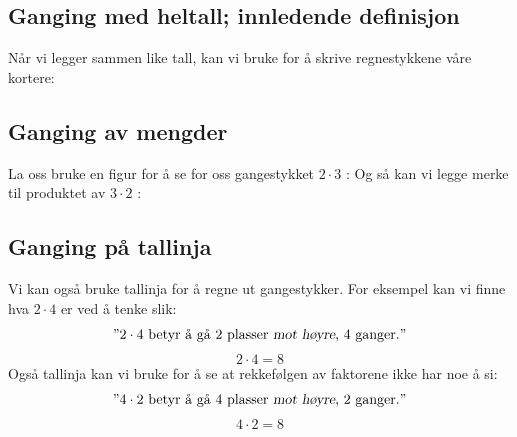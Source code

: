 \subsection*{Ganging med heltall; innledende definisjon}
Når vi legger sammen like tall, kan vi bruke  
\sym{$ \cdot $}
for å skrive regnestykkene våre kortere: \regv
{} \regv
{}

\newpage
\subsection*{Ganging av mengder} \label{gangmengd}
La oss bruke en figur for å se for oss gangestykket 
$ 2\cdot3 $
\!\!:
Og så kan vi legge merke til produktet av 
$ 3\cdot 2 $
\!\!:

\subsection*{Ganging på tallinja}
Vi kan også bruke tallinja for å regne ut gangestykker. For eksempel kan vi finne hva 
$ 2\cdot4 $
 er ved å tenke slik:
\[\text{''} 2\cdot 4 \text{ betyr å gå 2 plasser \textsl{mot høyre}, 4 ganger.}\text{''} \]
\[ 2\cdot4=8 \]
{}
Også tallinja kan vi bruke for å se at rekkefølgen av faktorene ikke har noe å si:
\[\text{''} 4\cdot 2 \text{ betyr å gå 4 plasser \textsl{mot høyre}, 2 ganger.}\text{''} \]
\[ 4\cdot2=8 \]
{}

